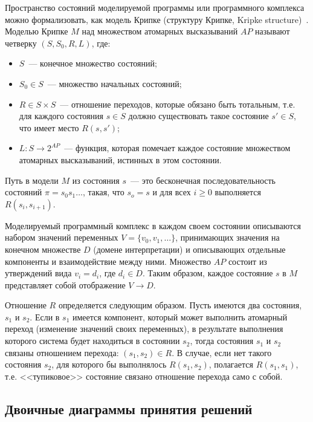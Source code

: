 \documentclass[a4paper,notitlepage,14pt]{article}
\begin{document}
Пространство состояний моделируемой программы или программного комплекса можно
формализовать, как модель Крипке (структуру Крипке, Kripke
structure)~\cite{Clarke}. Моделью Крипке $M$ над множеством атомарных высказываний $AP$
называют четверку $(S, S_0, R, L)$, где:

\begin{itemize}
\item $S$~--- конечное множество состояний;
\item $S_0 \in S$~--- множество начальных состояний;
\item $R \in S \times S$~--- отношение переходов, которые обязано быть тотальным, т.е. для
  каждого состояния $s \in S$ должно существовать такое состояние $s' \in S$, что имеет
  место $R(s, s')$;
\item $L\colon S \rightarrow 2^{AP}$~--- функция, которая помечает каждое состояние
  множеством атомарных высказываний, истинных в этом состоянии.
\end{itemize}

Путь в модели $M$ из состояния $s$~--- это бесконечная последовательность состояний $\pi =
s_0 s_1 \ldots$, такая, что $s_o = s$ и для всех $i \geq 0$ выполняется $R(s_i, s_{i+1})$.

Моделируемый программный комплекс в каждом своем состоянии описываются набором значений
переменных $V = \{v_0, v_1, \ldots\}$, принимающих значения на конечном множестве $D$
(домене интерпретации) и описывающих отдельные компоненты и взаимодействие между
ними. Множество $AP$ состоит из утверждений вида $v_i = d_i$, где $d_i \in D$. Таким
образом, каждое состояние $s$ в $M$ представляет собой отображение $V \rightarrow D$.

Отношение $R$ определяется следующим образом. Пусть имеются два состояния, $s_1$ и
$s_2$. Если в $s_1$ имеется компонент, который может выполнить атомарный переход
(изменение значений своих переменных), в результате выполнения которого система будет
находиться в состоянии $s_2$, тогда состояния $s_1$ и $s_2$ связаны отношением перехода:
$(s_1, s_2) \in R$. В случае, если нет такого состояния $s_2$, для которого бы выполнялось
$R(s_1, s_2)$, полагается $R(s_1, s_1)$, т.е. <<тупиковое>> состояние связано отношение
перехода само с собой.

\subsection{Двоичные диаграммы принятия решений}
\label{sec:obdd}
\end{document}
